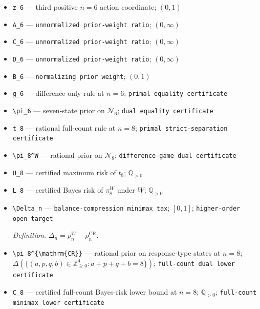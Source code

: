\documentclass{article}
\begin{document}
\begin{itemize}
  \item \texttt{z\_\allowbreak{}6} --- third positive \(n=6\) action coordinate; \((0,1)\)
  \item \texttt{A\_\allowbreak{}6} --- \texttt{unnormalized prior-\allowbreak{}weight ratio}; \((0,\infty)\)
  \item \texttt{C\_\allowbreak{}6} --- \texttt{unnormalized prior-\allowbreak{}weight ratio}; \((0,\infty)\)
  \item \texttt{D\_\allowbreak{}6} --- \texttt{unnormalized prior-\allowbreak{}weight ratio}; \((0,\infty)\)
  \item \texttt{B\_\allowbreak{}6} --- \texttt{normalizing prior weight}; \((0,1)\)
  \item \texttt{g\_\allowbreak{}6} --- difference-only rule at \(n=6\); \texttt{primal equality certificate}
  \item \texttt{\textbackslash{}\allowbreak{}pi\_\allowbreak{}6} --- seven-state prior on \(\mathcal N_6\); \texttt{dual equality certificate}
  \item \texttt{t\_\allowbreak{}8} --- rational full-count rule at \(n=8\); \texttt{primal strict-\allowbreak{}separation certificate}
  \item \texttt{\textbackslash{}\allowbreak{}pi\_\allowbreak{}8\textasciicircum{}W} --- rational prior on \(\mathcal N_8\); \texttt{difference-\allowbreak{}game dual certificate}
  \item \texttt{U\_\allowbreak{}8} --- certified maximum risk of \(t_8\); \(\mathbb Q_{>0}\)
  \item \texttt{L\_\allowbreak{}8} --- certified Bayes risk of \(\pi_8^W\) under \(W\); \(\mathbb Q_{>0}\)
  \item \texttt{\textbackslash{}\allowbreak{}Delta\_\allowbreak{}n} --- \texttt{balance-\allowbreak{}compression minimax tax}; \([0,1]\); \texttt{higher-\allowbreak{}order open target}
  \par\smallskip\noindent\emph{Definition.} \(\Delta_n=\rho_n^W-\rho_n^{\mathrm{CR}}\).
  \item \texttt{\textbackslash{}\allowbreak{}pi\_\allowbreak{}8\textasciicircum{}\{\textbackslash{}\allowbreak{}mathrm\{CR\}\allowbreak{}\}\allowbreak{}} --- rational prior on response-type states at \(n=8\); \(\Delta(\{(a,p,q,b)\in\mathbb Z_{\geq0}^4:a+p+q+b=8\})\); \texttt{full-\allowbreak{}count dual lower certificate}
  \item \texttt{C\_\allowbreak{}8} --- certified full-count Bayes-risk lower bound at \(n=8\); \(\mathbb Q_{>0}\); \texttt{full-\allowbreak{}count minimax lower certificate}

\end{itemize}
\end{document}

